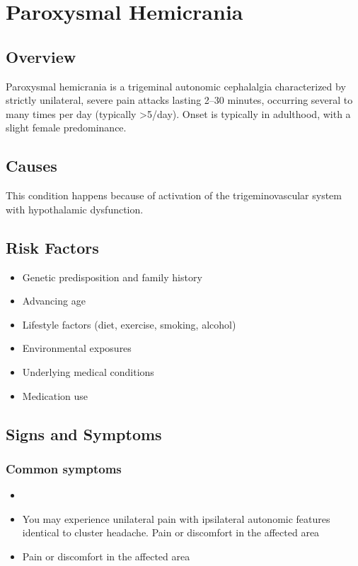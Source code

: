 \chapter{Paroxysmal Hemicrania}
\label{sec:Paroxysmal Hemicrania}

\section{Overview}
Paroxysmal hemicrania is a trigeminal autonomic cephalalgia characterized by strictly unilateral, severe pain attacks lasting 2--30 minutes, occurring several to many times per day (typically >5/day). Onset is typically in adulthood, with a slight female predominance.
\section{Causes}
This condition happens because of activation of the trigeminovascular system with hypothalamic dysfunction.     
\section{Risk Factors}

\begin{itemize}[noitemsep]
  \item Genetic predisposition and family history
  \item Advancing age
  \item Lifestyle factors (diet, exercise, smoking, alcohol)
  \item Environmental exposures
  \item Underlying medical conditions
  \item Medication use
\end{itemize}
\section{Signs and Symptoms}

\subsection{Common symptoms}
\begin{itemize}[noitemsep]
  \item \item You may experience unilateral pain with ipsilateral autonomic features identical to cluster headache. Pain or discomfort in the affected area    \item Pain or discomfort in the affected area
  \end{itemize}

